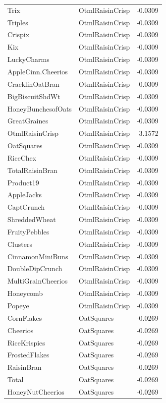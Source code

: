 \begin{longtable}{llr}
Trix & OtmlRaisinCrisp & -0.0309 \\
Triples & OtmlRaisinCrisp & -0.0309 \\
Crispix & OtmlRaisinCrisp & -0.0309 \\
Kix & OtmlRaisinCrisp & -0.0309 \\
LuckyCharms & OtmlRaisinCrisp & -0.0309 \\
AppleCinn.Cheerios & OtmlRaisinCrisp & -0.0309 \\
CracklinOatBran & OtmlRaisinCrisp & -0.0309 \\
BigBiscuitShdWt & OtmlRaisinCrisp & -0.0309 \\
HoneyBunchesofOats & OtmlRaisinCrisp & -0.0309 \\
GreatGraines & OtmlRaisinCrisp & -0.0309 \\
OtmlRaisinCrisp & OtmlRaisinCrisp & 3.1572 \\
OatSquares & OtmlRaisinCrisp & -0.0309 \\
RiceChex & OtmlRaisinCrisp & -0.0309 \\
TotalRaisinBran & OtmlRaisinCrisp & -0.0309 \\
Product19 & OtmlRaisinCrisp & -0.0309 \\
AppleJacks & OtmlRaisinCrisp & -0.0309 \\
CaptCrunch & OtmlRaisinCrisp & -0.0309 \\
ShreddedWheat & OtmlRaisinCrisp & -0.0309 \\
FruityPebbles & OtmlRaisinCrisp & -0.0309 \\
Clusters & OtmlRaisinCrisp & -0.0309 \\
CinnamonMiniBuns & OtmlRaisinCrisp & -0.0309 \\
DoubleDipCrunch & OtmlRaisinCrisp & -0.0309 \\
MultiGrainCheerios & OtmlRaisinCrisp & -0.0309 \\
Honeycomb & OtmlRaisinCrisp & -0.0309 \\
Popeye & OtmlRaisinCrisp & -0.0309 \\
CornFlakes & OatSquares & -0.0269 \\
Cheerios & OatSquares & -0.0269 \\
RiceKrispies & OatSquares & -0.0269 \\
FrostedFlakes & OatSquares & -0.0269 \\
RaisinBran & OatSquares & -0.0269 \\
Total & OatSquares & -0.0269 \\
HoneyNutCheerios & OatSquares & -0.0269 \\

\end{longtable}
